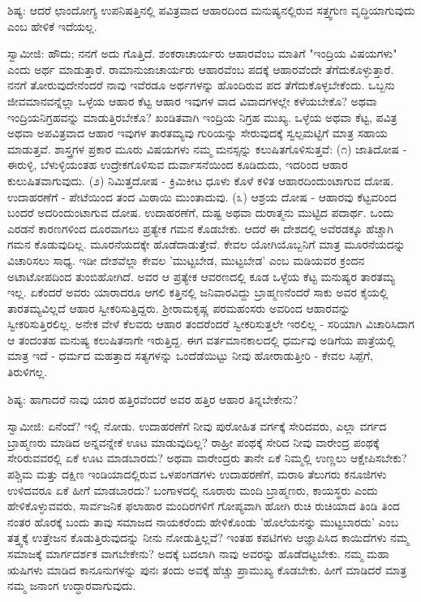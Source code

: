 ಶಿಷ್ಯ: ಆದರೆ ಛಾಂದೋಗ್ಯ ಉಪನಿಷತ್ತಿನಲ್ಲಿ ಪವಿತ್ರವಾದ ಆಹಾರದಿಂದ ಮನುಷ್ಯನಲ್ಲಿರುವ ಸತ್ತ್ವಗುಣ ವೃದ್ಧಿಯಾಗುವುದು ಎಂಬ ಹೇಳಿಕೆ ಇದೆಯಲ್ಲ.

ಸ್ವಾಮೀಜಿ: ಹೌದು; ನನಗೆ ಅದು ಗೊತ್ತಿದೆ. ಶಂಕರಾಚಾರ್ಯರು ಆಹಾರವೆಂಬ ಮಾತಿಗೆ "ಇಂದ್ರಿಯ ವಿಷಯಗಳು" ಎಂದು ಅರ್ಥ ಮಾಡುತ್ತಾರೆ. ರಾಮಾನುಜಾಚಾರ್ಯರು ಆಹಾರವೆಂಬ ಪದಕ್ಕೆ ಆಹಾರವೆಂದೇ ತೆಗೆದುಕೊಳ್ಳುತ್ತಾರೆ. ನನಗೆ ತೋರುವುದೇನೆಂದರೆ ನಾವು ಇವೆರಡೂ ಅರ್ಥಗಳನ್ನು ಹೊಂದಿರುವ ಪದ ತೆಗೆದುಕೊಳ್ಳಬೇಕೆಂದು. ಒಬ್ಬನು ಜೀವಮಾನವನ್ನೆಲ್ಲಾ ಒಳ್ಳೆಯ ಆಹಾರ ಕೆಟ್ಟ ಆಹಾರ ಇವುಗಳ ವಾದ ವಿವಾದಗಳಲ್ಲೇ ಕಳೆಯಬೇಕೊ? ಅಥವಾ ಇಂದ್ರಿಯನಿಗ್ರಹವನ್ನು ಮಾಡುತ್ತಿರಬೇಕೊ? ಖಂಡಿತವಾಗಿ ಇಂದ್ರಿಯ ನಿಗ್ರಹ ಮುಖ್ಯ. ಒಳ್ಳೆಯ ಅಥವಾ ಕೆಟ್ಟ, ಪವಿತ್ರ ಅಥವಾ ಅಪವಿತ್ರವಾದ ಆಹಾರ ಇವುಗಳ ತಾರತಮ್ಯವು ಗುರಿಯನ್ನು ಸೇರುವುದಕ್ಕೆ ಸ್ವಲ್ಪಮಟ್ಟಿಗೆ ಮಾತ್ರ ಸಹಾಯ ಮಾಡುತ್ತವೆ. ಶಾಸ್ತ್ರಗಳ ಪ್ರಕಾರ ಮೂರು ವಿಷಯಗಳು ನಮ್ಮ ಮನಸ್ಸನ್ನು ಕಲುಷಿತಗೊಳಿಸುತ್ತವೆ: (೧) ಜಾತಿದೋಷ - ಈರುಳ್ಳಿ, ಬೆಳುಳ್ಳಿಯಂತಹ ಉದ್ರೇಕಗೊಳಿಸುವ ದುರ್ವಾಸನೆಯಿಂದ ಕೂಡಿದುದು, ಇದರಿಂದ ಆಹಾರ ಕುಲುಷಿತವಾಗುವುದು. (೨) ನಿಮಿತ್ತದೋಷ - ಕ್ರಿಮಿಕೀಟ ಧೂಳು ಕೊಳೆ ಕಳಿತ ಆಹಾರದಿಂದುಂಟಾಗುವ ದೋಷ. ಉದಾಹರಣೆಗೆ - ಪೇಟೆಯಿಂದ ತಂದ ಮಿಠಾಯಿ ಮುಂತಾದುವು. (೩) ಆಶ್ರಯ ದೋಷ - ಆಹಾರವು ಕೆಟ್ಟವರಿಂದ ಬಂದರೆ ಅದರಿಂದುಂಟಾಗುವ ದೋಷ. ಉದಾಹರಣೆಗೆ, ದುಷ್ಟ ಅಥವಾ ದುರಾತ್ಮನು ಮುಟ್ಟಿದ ಪದಾರ್ಥ. ಒಂದು ಎರಡನೆ ಕಾರಣಗಳಿಂದ ದೂರವಾಗಲು ಪ್ರತ್ಯೇಕ ಗಮನ ಕೊಡಬೇಕು. ಆದರೆ ಈ ದೇಶದಲ್ಲಿ ಅವೆರಡಕ್ಕೂ ಹೆಚ್ಚಾಗಿ ಗಮನ ಕೊಡುವುದಿಲ್ಲ. ಮೂರನೆಯದಕ್ಕೇ ಹೊಡೆದಾಡುತ್ತೇವೆ. ಕೇವಲ ಯೋಗಿಯೊಬ್ಬನಿಗೆ ಮಾತ್ರ ಮೂರನೆಯದನ್ನು ವಿಚಾರಿಸಲು ಸಾಧ್ಯ. ಇಡೀ ದೇಶವೆಲ್ಲಾ ಕೇವಲ 'ಮುಟ್ಟಬೇಡ, ಮುಟ್ಟಬೇಡ' ಎಂಬ ಮಡಿಯವರ ಕ್ರಂದನ ಅಟಾಟೋಪದಿಂದ ತುಂಬಿಹೋಗಿದೆ. ಅವರ ಆ ಪ್ರತ್ಯೇಕ ಆವರಣದಲ್ಲಿ ಕೂಡ ಒಳ್ಳೆಯ ಕೆಟ್ಟ ಮನುಷ್ಯರ ತಾರತಮ್ಯ ಇಲ್ಲ. ಏಕೆಂದರೆ ಅವರು ಯಾರಾದರೂ ಆಗಲಿ ಕತ್ತಿನಲ್ಲಿ ಜನಿವಾರವಿದ್ದು ಬ್ರಾಹ್ಮಣನೆಂದರೆ ಸಾಕು ಅವರ ಕೈಯಲ್ಲಿ ತಾರತಮ್ಯವಿಲ್ಲದೆ ಆಹಾರ ಸ್ವೀಕರಿಸುತ್ತಿದ್ದರು. ಶ‍್ರೀರಾಮಕೃಷ್ಣ ಪರಮಹಂಸರು ಅವರಿಂದ ಆಹಾರವನ್ನು ಸ್ವೀಕರಿಸುತ್ತಿರಲಿಲ್ಲ. ಅನೇಕ ವೇಳೆ ಕೆಲವರು ಆಹಾರ ತಂದರೆಂದರೆ ಸ್ವೀಕರಿಸುತ್ತಲೇ ಇರಲಿಲ್ಲ - ಸರಿಯಾಗಿ ವಿಚಾರಿಸಿದಾಗ ಆ ತಂದಂತಹ ಮನುಷ್ಯ ಕಲುಷಿತನಾಗೇ ಇರುತ್ತಿದ್ದ. ಈಗ ವರ್ತಮಾನಕಾಲದಲ್ಲಿ ಧರ್ಮವು ಅಡಿಗೆಯ ಪಾತ್ರೆಯಲ್ಲಿ ಮಾತ್ರ ಇದೆ - ಧರ್ಮದ ಮಹತ್ತಾದ ಸತ್ಯಗಳನ್ನು ಒಂದೆಡೆಯಿಟ್ಟು ನೀವು ಹೋರಾಡುತ್ತೀರಿ - ಕೇವಲ ಸಿಪ್ಪೆಗೆ, ತಿರುಳಿಗಲ್ಲ.

ಶಿಷ್ಯ: ಹಾಗಾದರೆ ನಾವು ಯಾರ ಹತ್ತಿರವೆಂದರೆ ಅವರ ಹತ್ತಿರ ಆಹಾರ ತಿನ್ನಬೇಕೇನು?

ಸ್ವಾಮೀಜಿ: ಏನೆಂದೆ? ಇಲ್ಲಿ ನೋಡು. ಉದಾಹರಣೆಗೆ ನೀವು ಪುರೋಹಿತ ವರ್ಗಕ್ಕೆ ಸೇರಿದವರು, ಎಲ್ಲಾ ವರ್ಗದ ಬ್ರಾಹ್ಮಣರು ಮಾಡಿದ ಅನ್ನವನ್ನೇಕೆ ಊಟ ಮಾಡುವುದಿಲ್ಲ? ರಾಹ್ರೀ ಪಂಥಕ್ಕೆ ಸೇರಿದ ನೀವು ವಾರೇಂದ್ರ ಪಂಥಕ್ಕೆ ಸೇರಿರುವವರಲ್ಲಿ ಏಕೆ ಊಟ ಮಾಡಬಾರದು? ಅಥವಾ ವಾರೇಂದ್ರರು ತಾನೇ ಏಕೆ ನಿಮ್ಮಲ್ಲಿ ಉಣ್ಣಲು ಆಕ್ಷೇಪಿಸಬೇಕು? ಪಶ್ಚಿಮ ಮತ್ತು ದಕ್ಷಿಣ ಇಂಡಿಯಾದಲ್ಲಿರುವ ಒಳಪಂಗಡಗಳು ಉದಾಹರಣೆಗೆ, ಮರಾಠಿ ತೆಲುಗರು ಕನೂಜಿಗಳು ಉಳಿದವರೂ ಏಕೆ ಹೀಗೆ ಮಾಡಬಾರದು? ಬಂಗಾಳದಲ್ಲಿ ನೂರಾರು ಮಂದಿ ಬ್ರಾಹ್ಮಣರು, ಕಾಯಸ್ಥರು ಎಂದು ಹೇಳಿಕೊಳ್ಳುವವರು, ಸಾರ್ವಜನಿಕ ಫಲಾಹಾರ ಮಂದಿರಗಳಿಗೆ ಗೋಪ್ಯವಾಗಿ ಹೋಗಿ ರುಚಿ ರುಚಿಯಾದ ತಿಂಡಿ ತಿಂದ ನಂತರ ಹೊರಕ್ಕೆ ಬಂದು ತಾವು ಸಮಾಜದ ನಾಯಕರೆಂದು ಹೇಳಿಕೊಂಡು 'ಹೊಲೆಯನನ್ನು ಮುಟ್ಟಬಾರದು' ಎಂಬ ತತ್ತ್ವಕ್ಕೆ ಉತ್ತೇಜನ ಕೊಡುತ್ತಿರುವುದನ್ನು ನೀನು ನೋಡುತ್ತಿಲ್ಲವೆ? ಇಂತಹ ಕಪಟಿಗಳು ಆಜ್ಞಾಪಿಸಿದ ಕಾಯಿದೆಗಳು ನಮ್ಮ ಸಮಾಜಕ್ಕೆ ಮಾರ್ಗದರ್ಶಕ ವಾಗಬೇಕೇನು? ಅದಕ್ಕೆ ಬದಲಾಗಿ ನಾವು ಅವರನ್ನು ಹೊಡೆದಟ್ಟಬೇಕು. ನಮ್ಮ ಮಹಾ ಋಷಿಗಳು ಮಾಡಿದ ಕಾನೂನುಗಳನ್ನು ಪುನಃ ತಂದು ಅವಕ್ಕೆ ಹೆಚ್ಚು ಪ್ರಾಮುಖ್ಯ ಕೊಡಬೇಕು. ಹೀಗೆ ಮಾಡಿದರೆ ಮಾತ್ರ ನಮ್ಮ ಜನಾಂಗ ಉದ್ಧಾರವಾಗುವುದು.

